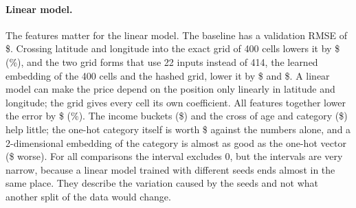 \paragraph{Linear model.} The features matter for the linear model. The baseline has a validation RMSE of \$. Crossing latitude and longitude into the exact grid of 400 cells lowers it by \$ (\%), and the two grid forms that use 22 inputs instead of 414, the learned embedding of the 400 cells and the hashed grid, lower it by \$ and \$. A linear model can make the price depend on the position only linearly in latitude and longitude; the grid gives every cell its own coefficient. All features together lower the error by \$ (\%). The income buckets (\$) and the cross of age and category (\$) help little; the one-hot category itself is worth \$ against the numbers alone, and a 2-dimensional embedding of the category is almost as good as the one-hot vector (\$ worse). For all  comparisons the interval excludes 0, but the intervals are very narrow, because a linear model trained with different seeds ends almost in the same place. They describe the variation caused by the seeds and not what another split of the data would change.

